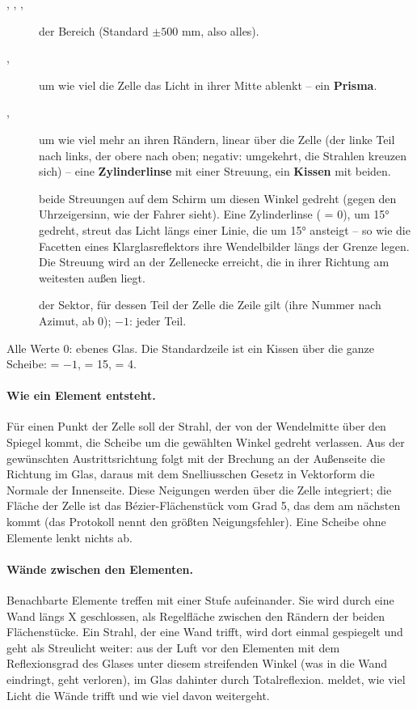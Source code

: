 \begin{description}
  \item[, , , ] der Bereich (Standard $\pm 500$ mm, also
    alles).
  \item[, ] um wie viel die Zelle das Licht in ihrer Mitte ablenkt --
    ein \textbf{Prisma}.
  \item[, ] um wie viel mehr an ihren Rändern, linear über
    die Zelle (der linke Teil nach links, der obere nach oben; negativ: umgekehrt, die Strahlen
    kreuzen sich) -- eine \textbf{Zylinderlinse} mit einer Streuung, ein \textbf{Kissen} mit beiden.
  \item[] beide Streuungen auf dem Schirm um diesen Winkel gedreht (gegen den
    Uhrzeigersinn, wie der Fahrer sieht). Eine Zylinderlinse ( = 0), um
    \ang{15} gedreht, streut das Licht längs einer Linie, die um \ang{15} ansteigt -- so wie die
    Facetten eines Klarglasreflektors ihre Wendelbilder längs der Grenze legen. Die Streuung wird an
    der Zellenecke erreicht, die in ihrer Richtung am weitesten außen liegt.
  \item[] der Sektor, für dessen Teil der Zelle die Zeile gilt (ihre Nummer nach Azimut,
    ab 0); $-1$: jeder Teil.
\end{description}

Alle Werte 0: ebenes Glas. Die Standardzeile ist ein Kissen über die ganze Scheibe:
 = $-1$,  = 15,  = 4.

\paragraph{Wie ein Element entsteht.} Für einen Punkt der Zelle soll der Strahl, der von der Wendelmitte
über den Spiegel kommt, die Scheibe um die gewählten Winkel gedreht verlassen. Aus der gewünschten
Austrittsrichtung folgt mit der Brechung an der Außenseite die Richtung im Glas, daraus mit dem
Snelliusschen Gesetz in Vektorform die Normale der Innenseite. Diese Neigungen werden über die Zelle
integriert; die Fläche der Zelle ist das B\'ezier-Flächenstück vom Grad 5, das dem am nächsten kommt
(das Protokoll nennt den größten Neigungsfehler). Eine Scheibe ohne Elemente lenkt nichts ab.

\paragraph{Wände zwischen den Elementen.} Benachbarte Elemente treffen mit einer Stufe aufeinander.
Sie wird durch eine Wand längs X geschlossen, als Regelfläche zwischen den Rändern der beiden
Flächenstücke. Ein Strahl, der eine Wand trifft, wird dort einmal gespiegelt und geht als Streulicht
weiter: aus der Luft vor den Elementen mit dem Reflexionsgrad des Glases unter diesem streifenden
Winkel (was in die Wand eindringt, geht verloren), im Glas dahinter durch Totalreflexion.
 meldet, wie viel Licht die Wände trifft und wie viel davon weitergeht.

